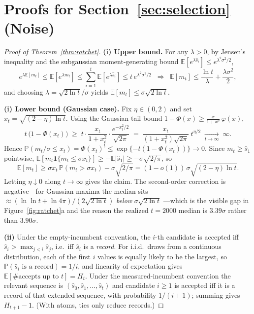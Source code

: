 \documentclass{article}
\theoremstyle{plain}
\theoremstyle{definition}
\theoremstyle{remark}
\newcommand{\E}{\mathbb{E}}
\renewcommand{\P}{\mathbb{P}}
\begin{document}
\section{Proofs for Section~\ref{sec:selection} (Noise)}
\label{app:noise}

\begin{proof}[Proof of Theorem~\ref{thm:ratchet}]
\textbf{(i) Upper bound.} For any $\lambda > 0$, by Jensen's inequality and the subgaussian moment-generating bound $\E[e^{\lambda \hat{s}_i}] \le e^{\lambda^2\sigma^2/2}$,
\[
e^{\lambda \E[m_t]} \le \E[e^{\lambda m_t}] \le \sum_{i=1}^{t} \E[e^{\lambda \hat{s}_i}] \le t\, e^{\lambda^2 \sigma^2 / 2}
\;\;\Longrightarrow\;\;
\E[m_t] \le \frac{\ln t}{\lambda} + \frac{\lambda \sigma^2}{2},
\]
and choosing $\lambda = \sqrt{2 \ln t}/\sigma$ yields $\E[m_t] \le \sigma \sqrt{2 \ln t}$.

\textbf{(i) Lower bound (Gaussian case).} Fix $\eta \in (0,2)$ and set $x_t = \sqrt{(2-\eta)\ln t}$. Using the Gaussian tail bound $1 - \Phi(x) \ge \frac{x}{1+x^2}\,\varphi(x)$,
\[
t\,\big(1 - \Phi(x_t)\big) \;\ge\; t \cdot \frac{x_t}{1+x_t^2} \cdot \frac{e^{-x_t^2/2}}{\sqrt{2\pi}}
\;=\; \frac{x_t}{(1+x_t^2)\sqrt{2\pi}} \; t^{\eta/2} \;\xrightarrow[t \to \infty]{}\; \infty .
\]
Hence $\P(m_t/\sigma \le x_t) = \Phi(x_t)^t \le \exp\{-t(1-\Phi(x_t))\} \to 0$. Since $m_t \ge \hat{s}_1$ pointwise, $\E[m_t \mathbf{1}\{m_t \le \sigma x_t\}] \ge -\E|\hat{s}_1| \ge -\sigma\sqrt{2/\pi}$, so
\[
\E[m_t] \ge \sigma x_t \,\P(m_t > \sigma x_t) - \sigma\sqrt{2/\pi} = (1-o(1))\,\sigma\sqrt{(2-\eta) \ln t}.
\]
Letting $\eta \downarrow 0$ along $t \to \infty$ gives the claim. The second-order correction is negative---for Gaussian maxima the median sits $\approx (\ln\ln t + \ln 4\pi)/(2\sqrt{2\ln t})$ \emph{below} $\sigma\sqrt{2\ln t}$ \citep{boucheron2013concentration}---which is the visible gap in Figure~\ref{fig:ratchet}a and the reason the realized $t = 2000$ median is $3.39\sigma$ rather than $3.90\sigma$.

\textbf{(ii)} Under the empty-incumbent convention, the $i$-th candidate is accepted iff $\hat{s}_i > \max_{j < i} \hat{s}_j$, i.e.\ iff $\hat s_i$ is a \emph{record}. For i.i.d.\ draws from a continuous distribution, each of the first $i$ values is equally likely to be the largest, so $\P(\hat{s}_i \text{ is a record}) = 1/i$, and linearity of expectation gives $\E[\#\text{accepts up to } t] = H_t$. Under the measured-incumbent convention the relevant sequence is $(\hat s_0, \hat s_1, \dots, \hat s_t)$ and candidate $i \ge 1$ is accepted iff it is a record of that extended sequence, with probability $1/(i+1)$; summing gives $H_{t+1} - 1$. (With atoms, ties only reduce records.)
\end{proof}
\end{document}
